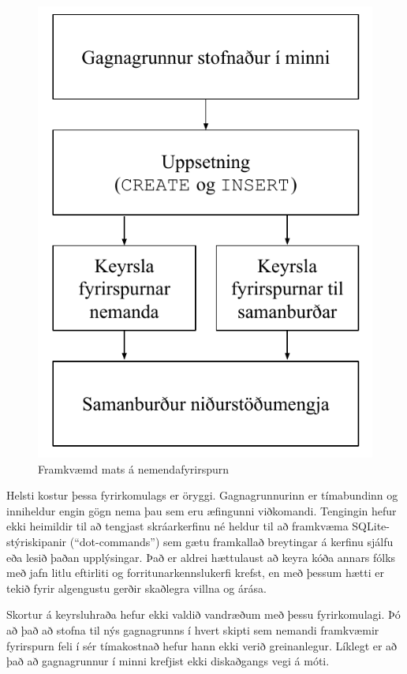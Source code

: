 \documentclass[a4paper,12pt,twoside,BCOR=10mm]{scrbook}
\begin{document}
\begin{figure}
\caption{Framkvæmd mats á nemendafyrirspurn}
\label{fig:sql-evaluation-execution}
\begin{center}
\includegraphics{keyrsla-fyrirspurnar}
\end{center}
\end{figure}

Helsti kostur þessa fyrirkomulags er öryggi. Gagnagrunnurinn er tímabundinn og inniheldur engin gögn nema þau sem eru æfingunni viðkomandi. Tengingin hefur ekki heimildir til að tengjast skráarkerfinu né heldur til að framkvæma SQLite-stýriskipanir (``dot-commands'') sem gætu framkallað breytingar á kerfinu sjálfu eða lesið þaðan upplýsingar. Það er aldrei hættulaust að keyra kóða annars fólks með jafn litlu eftirliti og forritunarkennslukerfi krefst, en með þessum hætti er tekið fyrir algengustu gerðir skaðlegra villna og árása.

Skortur á keyrsluhraða hefur ekki valdið vandræðum með þessu fyrirkomulagi. Þó að það að stofna til nýs gagnagrunns í hvert skipti sem nemandi framkvæmir fyrirspurn feli í sér tímakostnað hefur hann ekki verið greinanlegur. Líklegt er að það að gagnagrunnur í minni krefjist ekki diskaðgangs vegi á móti.
\end{document}
